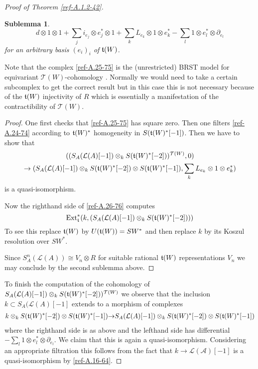 \documentclass{amsart}
\numberwithin{equation}{section}
\let\cal\mathcal
\newtheorem*{sublemma}{Sublemma}
\theoremstyle{definition}
\theoremstyle{remark}
\begin{document}
\begin{proof}[Proof of Theorem \ref{ref-A.1.2-42}]
\begin{sublemma}
\begin{equation}
\label{ref-A.25-75}
d\otimes 1\otimes 1+\sum_{j} i_{e_j}\otimes e_j^\ast\otimes 1+
\sum_{k} L_{e_k}\otimes 1\otimes e_k^\ast
-\sum_{l}1\otimes e_l^\ast\otimes \partial_{e_l}
\end{equation}
for an arbitrary basis $(e_i)_i$ of $\frak{t}(W)$. 
\end{sublemma}
Note that the complex \eqref{ref-A.25-75} is the (unrestricted) BRST
model for equivariant ${{\cal T}}(W)$-cohomology
\cite[\S3]{Kalkman}. Normally we would need to take a certain
subcomplex to get the correct result but in this case this is not
necessary because of the $\frak{t}(W)$ injectivity of $R$ which is
essentially a manifestation of the contractibility of ${{\cal T}}(W)$.
\begin{proof} One first checks that \eqref{ref-A.25-75} has square zero. Then
one filters \eqref{ref-A.24-74} according to $\frak{t}(W)^\ast$ homogeneity
in $S(\frak{t}(W)^\ast[-1])$. Then we have to show that
\begin{multline}
\label{ref-A.26-76}
((S_A({{\cal L}}(A)[-1])\otimes_k S(\frak{t}(W)^\ast[-2]))^{{{\cal T}}(W)},0)
\\\rightarrow (S_A({{\cal L}}(A)[-1])\otimes_k S(\frak{t}(W)^\ast[-2])\otimes S(\frak{t}(W)^\ast[-1]),\sum_{k} L_{e_k}\otimes 1\otimes e_k^\ast)
\end{multline}
is a quasi-isomorphism. 

Now the righthand side of \eqref{ref-A.26-76} computes 
\[
{\operatorname {Ext}}^\ast_{\frak{t}}(k,(S_A({{\cal L}}(A)[-1])\otimes_k S(\frak{t}(W)^\ast[-2])))
\]
To see this replace $\frak{t}(W)$ by $U(\frak{t}(W))=SW^\ast$ and then replace
$k$ by its Koszul resolution over $SW^\ast$. 

Since $S_A^n({{\cal L}}(A))\cong V_n\otimes R$
for  suitable rational $\frak{t}(W)$ representations $V_n$ we may conclude
by the second sublemma above. 
\end{proof}
To finish the computation of the cohomology of $S_A({{\cal L}}(A)[-1])\otimes_k
S(\frak{t}(W)^\ast[-2]))^{{{\cal T}}(W)}$ we observe that the inclusion $k\subset S_A({{\cal L}}(A)[-1]$ extends to a morphism of complexes
\begin{multline*}
k\otimes_k S(\frak{t}(W)^\ast[-2])\otimes S(\frak{t}(W)^\ast[-1])
{\rightarrow}
S_A({{\cal L}}(A)[-1])\otimes_k S(\frak{t}(W)^\ast[-2])\otimes S(\frak{t}(W)^\ast[-1])
\end{multline*}
where the righthand side is as above and the lefthand side has differential
$-\sum_{l}1\otimes e_l^\ast\otimes \partial_{e_l}$. We claim that this is
again a quasi-isomorphism. Considering an appropriate filtration 
this follows from the fact that $k\rightarrow {{\cal L}}({{\cal A}})[-1]$ is a quasi-isomorphism
by \eqref{ref-A.16-64}. 


\end{proof}
\end{document}

